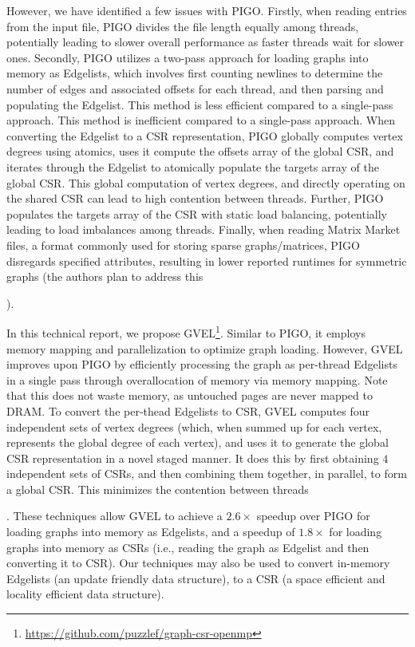However, we have identified a few issues with PIGO. Firstly, when reading entries from the input file, PIGO divides the file length equally among threads, potentially leading to slower overall performance as faster threads wait for slower ones. Secondly, PIGO utilizes a two-pass approach for loading graphs into memory as Edgelists, which involves first counting newlines to determine the number of edges and associated offsets for each thread, and then parsing and populating the Edgelist. This method is less efficient compared to a single-pass approach. This method is inefficient compared to a single-pass approach. When converting the Edgelist to a CSR representation, PIGO globally computes vertex degrees using atomics, uses it compute the offsets array of the global CSR, and iterates through the Edgelist to atomically populate the targets array of the global CSR. This global computation of vertex degrees, and directly operating on the shared CSR can lead to high contention between threads. Further, PIGO populates the targets array of the CSR with static load balancing, potentially leading to load imbalances among threads. Finally, when reading Matrix Market files, a format commonly used for storing sparse graphs/matrices, PIGO disregards specified attributes, resulting in lower reported runtimes for symmetric graphs (the authors plan to address this).

In this technical report, we propose GVEL\footnote{\url{https://github.com/puzzlef/graph-csr-openmp}}. Similar to PIGO, it employs memory mapping and parallelization to optimize graph loading. However, GVEL improves upon PIGO by efficiently processing the graph as per-thread Edgelists in a single pass through overallocation of memory via memory mapping. Note that this does not waste memory, as untouched pages are never mapped to DRAM. To convert the per-thead Edgelists to CSR, GVEL computes four independent sets of vertex degrees (which, when summed up for each vertex, represents the global degree of each vertex), and uses it to generate the global CSR representation in a novel staged manner. It does this by first obtaining $4$ independent sets of CSRs, and then combining them together, in parallel, to form a global CSR. This minimizes the contention between threads. These techniques allow GVEL to achieve a $2.6\times$ speedup over PIGO for loading graphs into memory as Edgelists, and a speedup of $1.8\times$ for loading graphs into memory as CSRs (i.e., reading the graph as Edgelist and then converting it to CSR). Our techniques may also be used to convert in-memory Edgelists (an update friendly data structure), to a CSR (a space efficient and locality efficient data structure).




